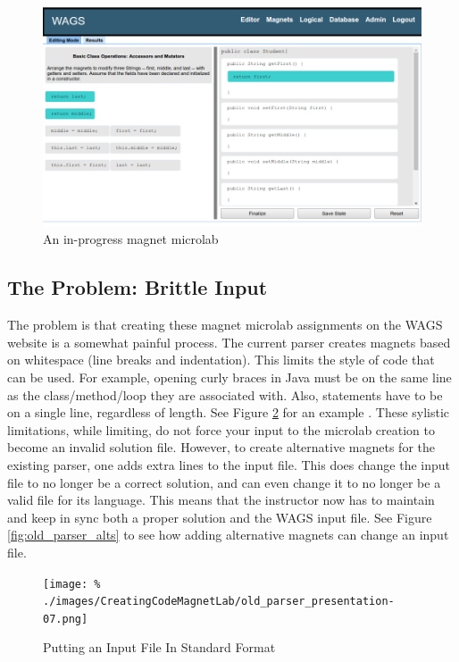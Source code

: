 \documentclass[letter,10pt]{article}
\begin{document}
\begin{figure}[h!]
 \centering
 \includegraphics{./images/magnet-lab.png}
 \caption{An in-progress magnet microlab}
 \label{fig:magnet-lab}
\end{figure}

\subsection{The Problem: Brittle Input}

The problem is that creating these magnet microlab assignments on the 
WAGS website is a somewhat painful process. The current parser creates 
magnets based on whitespace (line breaks and indentation). This limits 
the style of code that can be used. For example, opening curly braces 
in Java must be on the same line as the class/method/loop they are 
associated with. Also, statements have to be on a single line, 
regardless of length. See Figure \ref{fig:old_parser_style} for an 
example \cite{icer_pres_4_creating_lab}. These sylistic limitations, 
while limiting, do not force your input to the microlab creation to 
become an invalid solution file. However, to create alternative magnets 
for the existing parser, one adds extra lines to the input file. This 
does change the input file to no longer be a correct solution, and can 
even change it to no longer be a valid file for its language. This 
means that the instructor now has to maintain and keep in sync both a 
proper solution and the WAGS input file. See Figure 
\ref{fig:old_parser_alts} to see how adding alternative magnets 
can change an input file\cite{icer_pres_4_creating_lab}.

\begin{figure}[h!]
 \centering
 
  \texttt{[image: \%    
./images/CreatingCodeMagnetLab/old\_parser\_presentation-07.png]}
 \caption{Putting an Input File In Standard Format}
 \label{fig:old_parser_style}
\end{figure}
\end{document}

